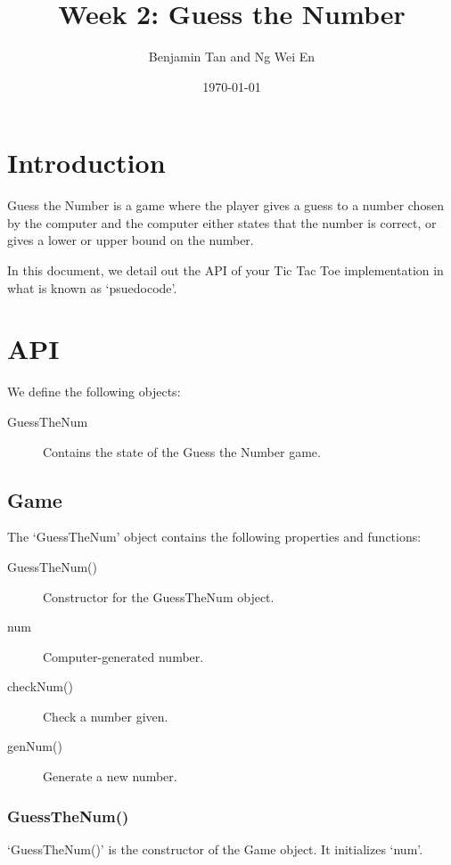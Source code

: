 \documentclass{article}
\title{Week 2: Guess the Number}
\author{Benjamin Tan and Ng Wei En}
\date{\today}
\begin{document}
\maketitle

\section{Introduction}

Guess the Number is a game where the player gives a guess to a number chosen by the computer and the computer either states that the number is correct, or gives a lower or upper bound on the number.

In this document, we detail out the API of your Tic Tac Toe implementation in what is known as `psuedocode'.

\section{API}

We define the following objects:

\begin{description}
  \item[GuessTheNum] Contains the state of the Guess the Number game.
\end{description}

\subsection{Game}

The `GuessTheNum' object contains the following properties and functions:

\begin{description}
  \item[GuessTheNum()] Constructor for the GuessTheNum object.

  \item[num] Computer-generated number.

  \item[checkNum()] Check a number given.
  \item[genNum()] Generate a new number.
\end{description}

\subsubsection{GuessTheNum()}

`GuessTheNum()' is the constructor of the Game object. It initializes `num'.
\end{document}
